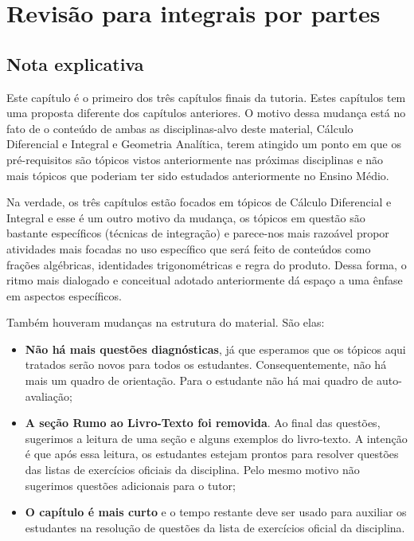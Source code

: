 \documentclass[main_estudante.tex]{subfiles}
\begin{document}
\chapter{Revisão para integrais por partes}

\section{Nota explicativa}

Este capítulo é o primeiro dos três capítulos finais da tutoria. Estes capítulos tem uma proposta diferente dos capítulos anteriores. O motivo dessa mudança está no fato de o conteúdo de ambas as disciplinas-alvo deste material, Cálculo Diferencial e Integral e Geometria Analítica, terem atingido um ponto em que os pré-requisitos são tópicos vistos anteriormente nas próximas disciplinas e não mais tópicos que poderiam ter sido estudados anteriormente no Ensino Médio.

Na verdade, os três capítulos estão focados em tópicos de Cálculo Diferencial e Integral e esse é um outro motivo da mudança, os tópicos em questão são bastante específicos (técnicas de integração) e parece-nos mais razoável propor atividades mais focadas no uso específico que será feito de conteúdos como frações algébricas, identidades trigonométricas e regra do produto. Dessa forma, o ritmo mais dialogado e conceitual adotado anteriormente dá espaço a uma ênfase em aspectos específicos.

Também houveram mudanças na estrutura do material. São elas:

\begin{itemize}
 \item \textbf{Não há mais questões diagnósticas}, já que esperamos que os tópicos aqui tratados serão novos para todos os estudantes. Consequentemente, não há mais um quadro de orientação. Para o estudante não há mai quadro de auto-avaliação;
 \item \textbf{A seção Rumo ao Livro-Texto foi removida}. Ao final das questões, sugerimos a leitura de uma seção e alguns exemplos do livro-texto. A intenção é que após essa leitura, os estudantes estejam prontos para resolver questões das listas de exercícios oficiais da disciplina. Pelo mesmo motivo não sugerimos questões adicionais para o tutor;
 \item \textbf{O capítulo é mais curto} e o tempo restante deve ser usado para auxiliar os estudantes na resolução de questões da lista de exercícios oficial da disciplina.
\end{itemize}
\end{document}
